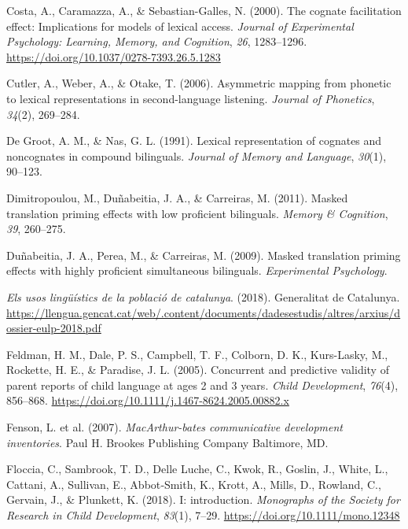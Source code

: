 \documentclass[
]{article}
\newlength{\cslhangindent}
\newlength{\cslentryspacingunit} %
\newenvironment{CSLReferences}[2] %
 {%
  \setlength{\parindent}{0pt}
  \ifodd #1
  \let\oldpar\par
  \def\par{\hangindent=\cslhangindent\oldpar}
  \fi
  \setlength{\parskip}{#2\cslentryspacingunit}
 }%
 {}
\begin{document}
\begin{CSLReferences}{1}{0}
\leavevmode{}%
Costa, A., Caramazza, A., \& Sebastian-Galles, N. (2000). The cognate
facilitation effect: Implications for models of lexical access.
\emph{Journal of Experimental Psychology: Learning, Memory, and
Cognition}, \emph{26}, 1283--1296.
\url{https://doi.org/10.1037/0278-7393.26.5.1283}

\leavevmode{}%
Cutler, A., Weber, A., \& Otake, T. (2006). Asymmetric mapping from
phonetic to lexical representations in second-language listening.
\emph{Journal of Phonetics}, \emph{34}(2), 269--284.

\leavevmode{}%
De Groot, A. M., \& Nas, G. L. (1991). Lexical representation of
cognates and noncognates in compound bilinguals. \emph{Journal of Memory
and Language}, \emph{30}(1), 90--123.

\leavevmode{}%
Dimitropoulou, M., Duñabeitia, J. A., \& Carreiras, M. (2011). Masked
translation priming effects with low proficient bilinguals. \emph{Memory
\& Cognition}, \emph{39}, 260--275.

\leavevmode{}%
Duñabeitia, J. A., Perea, M., \& Carreiras, M. (2009). Masked
translation priming effects with highly proficient simultaneous
bilinguals. \emph{Experimental Psychology}.

\leavevmode{}%
\emph{Els usos lingüístics de la població de catalunya}. (2018).
Generalitat de Catalunya.
\url{https://llengua.gencat.cat/web/.content/documents/dadesestudis/altres/arxius/dossier-eulp-2018.pdf}

\leavevmode{}%
Feldman, H. M., Dale, P. S., Campbell, T. F., Colborn, D. K.,
Kurs-Lasky, M., Rockette, H. E., \& Paradise, J. L. (2005). Concurrent
and predictive validity of parent reports of child language at ages 2
and 3 years. \emph{Child Development}, \emph{76}(4), 856--868.
\url{https://doi.org/10.1111/j.1467-8624.2005.00882.x}

\leavevmode{}%
Fenson, L. et al. (2007). \emph{{MacArthur}-bates communicative
development inventories}. Paul H. Brookes Publishing Company Baltimore,
{MD}.

\leavevmode{}%
Floccia, C., Sambrook, T. D., Delle Luche, C., Kwok, R., Goslin, J.,
White, L., Cattani, A., Sullivan, E., Abbot‐Smith, K., Krott, A., Mills,
D., Rowland, C., Gervain, J., \& Plunkett, K. (2018). I: introduction.
\emph{Monographs of the Society for Research in Child Development},
\emph{83}(1), 7--29. \url{https://doi.org/10.1111/mono.12348}


\end{CSLReferences}
\end{document}
